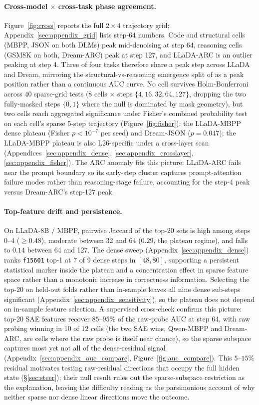 \documentclass[11pt]{article}
\begin{document}
\paragraph{Cross-model $\times$ cross-task phase agreement.}
\label{sec:cross}
Figure~\ref{fig:cross} reports the full $2{\times}4$ trajectory grid; Appendix~\ref{sec:appendix_grid} lists step-64 numbers.
Code and structural cells (MBPP, JSON on both DLMs) peak mid-denoising at step 64, reasoning cells (GSM8K on both, Dream-ARC) peak at step 127, and LLaDA-ARC is an outlier peaking at step 4.
Three of four tasks therefore share a peak step across LLaDA and Dream, mirroring the structural-vs-reasoning emergence split of \citet{chiu2026probe} as a peak position rather than a continuous AUC curve.
No cell survives Holm-Bonferroni across $40$ sparse-grid tests ($8$ cells $\times$ steps $\{4, 16, 32, 64, 127\}$, dropping the two fully-masked steps $\{0, 1\}$ where the null is dominated by mask geometry), but two cells reach aggregated significance under Fisher's combined probability test on each cell's sparse 5-step trajectory (Figure~\ref{fig:fisher}): the LLaDA-MBPP dense plateau (Fisher $p\!<\!10^{-7}$ per seed) and Dream-JSON ($p=0.047$); the LLaDA-MBPP plateau is also L26-specific under a cross-layer scan (Appendices~\ref{sec:appendix_dense}, \ref{sec:appendix_crosslayer}, \ref{sec:appendix_fisher}).
The ARC anomaly fits this picture: LLaDA-ARC fails near the prompt boundary so its early-step cluster captures prompt-attention failure modes rather than reasoning-stage failure, accounting for the step-4 peak versus Dream-ARC's step-127 peak.

\paragraph{Top-feature drift and persistence.}
On LLaDA-8B / MBPP, pairwise Jaccard of the top-20 sets is high among steps 0--4 ($\ge 0.48$), moderate between 32 and 64 ($0.29$, the plateau regime), and falls to $0.14$ between 64 and 127.
The dense sweep (Appendix~\ref{sec:appendix_dense}) ranks \texttt{f15601} top-1 at 7 of 9 dense steps in $[48,80]$, supporting a persistent statistical marker inside the plateau and a concentration effect in sparse feature space rather than a monotonic increase in correctness information.
Selecting the top-20 on held-out folds rather than in-sample leaves all nine dense sub-steps significant (Appendix~\ref{sec:appendix_sensitivity}), so the plateau does not depend on in-sample feature selection.
A supervised cross-check confirms this picture: top-20 SAE features recover $85$--$95\%$ of the raw-probe AUC at step 64, with raw probing winning in $10$ of $12$ cells (the two SAE wins, Qwen-MBPP and Dream-ARC, are cells where the raw probe is itself near chance), so the sparse subspace captures most yet not all of the dense-residual signal (Appendix~\ref{sec:appendix_auc_compare}, Figure~\ref{fig:auc_compare}).
This $5$--$15\%$ residual motivates testing raw-residual directions that occupy the full hidden state (\S\ref{sec:steer}); their null result rules out the sparse-subspace restriction as the explanation, leaving the difficulty reading as the parsimonious account of why neither sparse nor dense linear directions move the outcome.
\end{document}
